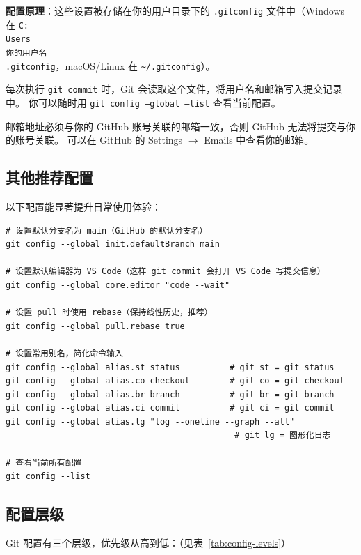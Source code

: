 \documentclass[12pt,a4paper,openany]{ctexbook}
\begin{document}
\medskip
\textbf{配置原理}：这些设置被存储在你的用户目录下的 \texttt{.gitconfig} 文件中（Windows 在 
\texttt{C:\\Users\\你的用户名\\.gitconfig}，macOS/Linux 在 \texttt{\textasciitilde/.gitconfig}）。

每次执行 \texttt{git commit} 时，Git 会读取这个文件，将用户名和邮箱写入提交记录中。
你可以随时用 \texttt{git config --global --list} 查看当前配置。
\medskip

\begin{warnbox}
邮箱地址必须与你的 GitHub 账号关联的邮箱一致，否则 GitHub 无法将提交与你的账号关联。
可以在 GitHub 的 Settings $\to$ Emails 中查看你的邮箱。
\end{warnbox}

\subsection{其他推荐配置}

以下配置能显著提升日常使用体验：

\begin{lstlisting}[style=shell]
# 设置默认分支名为 main（GitHub 的默认分支名）
git config --global init.defaultBranch main

# 设置默认编辑器为 VS Code（这样 git commit 会打开 VS Code 写提交信息）
git config --global core.editor "code --wait"

# 设置 pull 时使用 rebase（保持线性历史，推荐）
git config --global pull.rebase true

# 设置常用别名，简化命令输入
git config --global alias.st status          # git st = git status
git config --global alias.co checkout        # git co = git checkout
git config --global alias.br branch          # git br = git branch
git config --global alias.ci commit          # git ci = git commit
git config --global alias.lg "log --oneline --graph --all"
                                              # git lg = 图形化日志

# 查看当前所有配置
git config --list
\end{lstlisting}

\subsection{配置层级}

Git 配置有三个层级，优先级从高到低：（见表~\ref{tab:config-levels}）
\end{document}
